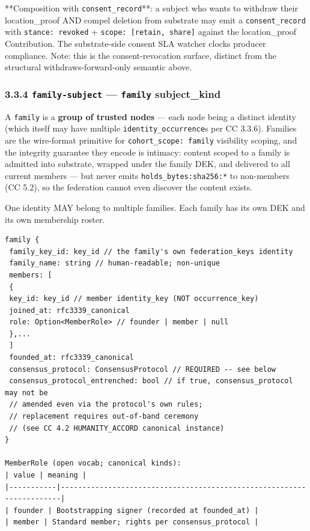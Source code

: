 \documentclass[11pt]{article}
\begin{document}
**Composition with \texttt{consent\_record}**: a subject who wants to withdraw their location\_proof AND compel deletion from substrate may emit a \texttt{consent\_record} with \texttt{stance: revoked} + \texttt{scope: [retain, share]} against the location\_proof Contribution. The substrate-side consent SLA watcher clocks producer compliance. Note: this is the consent-revocation surface, distinct from the structural withdraws-forward-only semantic above.


\subsubsection*{3.3.4 \texttt{family-subject} — \texttt{family} subject\_kind}


A \texttt{family} is a \textbf{group of trusted nodes} — each node being a distinct identity (which itself may have multiple \texttt{identity\_occurrence}s per CC 3.3.6). Families are the wire-format primitive for \texttt{cohort\_scope: family} visibility scoping, and the integrity guarantee they encode is intimacy: content scoped to a family is admitted into substrate, wrapped under the family DEK, and delivered to all current members — but never emits \texttt{holds\_bytes:sha256:*} to non-members (CC 5.2), so the federation cannot even discover the content exists.


One identity MAY belong to multiple families. Each family has its own DEK and its own membership roster.


\begin{lstlisting}
family {
 family_key_id: key_id // the family's own federation_keys identity
 family_name: string // human-readable; non-unique
 members: [
 {
 key_id: key_id // member identity_key (NOT occurrence_key)
 joined_at: rfc3339_canonical
 role: Option<MemberRole> // founder | member | null
 },...
 ]
 founded_at: rfc3339_canonical
 consensus_protocol: ConsensusProtocol // REQUIRED -- see below
 consensus_protocol_entrenched: bool // if true, consensus_protocol may not be
 // amended even via the protocol's own rules;
 // replacement requires out-of-band ceremony
 // (see CC 4.2 HUMANITY_ACCORD canonical instance)
}

MemberRole (open vocab; canonical kinds):
| value | meaning |
|-----------|----------------------------------------------------------------------|
| founder | Bootstrapping signer (recorded at founded_at) |
| member | Standard member; rights per consensus_protocol |
\end{lstlisting}
\end{document}
